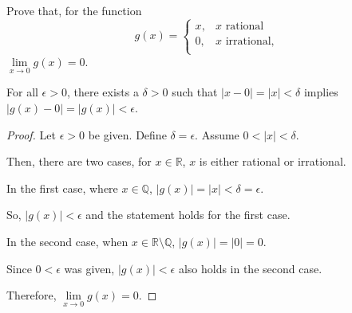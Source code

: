 \documentclass[../m134a-hw2.tex]{subfiles}
\begin{document}
Prove that, for the function \[g(x) = \begin{cases} 
    x, & \text{$x$ rational} \\
    0, & \text{$x$ irrational}, \\
\end{cases}\]
$\lim\limits_{x \to 0} g(x) = 0$.

\begin{proposition}
    For all $\epsilon>0$, there exists a $\delta>0$ such that $|x-0|=|x|<\delta$ implies $|g(x)-0|=|g(x)|<\epsilon$.
\end{proposition}

\begin{proof}
    Let $\epsilon>0$ be given.
    Define $\delta=\epsilon$.
    Assume $0<|x|<\delta$.
    
    Then, there are two cases, for $x \in \mathbb{R}$, $x$ is either rational or irrational.

    In the first case, where $x \in \mathbb{Q}$, $|g(x)|=|x|<\delta=\epsilon$.

    So, $|g(x)|<\epsilon$ and the statement holds for the first case.

    In the second case, when $x \in \mathbb{R} \setminus \mathbb{Q}$, $|g(x)|=|0|=0$. 
    
    Since $0<\epsilon$ was given, $|g(x)|<\epsilon$ also holds in the second case.

    Therefore, $\lim\limits_{x \to 0} g(x) = 0$.
\end{proof}
\end{document}
